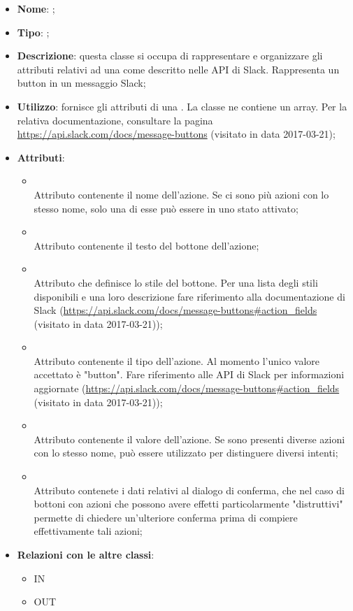\begin{itemize}
	\item \textbf{Nome}: ;
	\item \textbf{Tipo}: ;
	\item \textbf{Descrizione}: questa classe si occupa di rappresentare e organizzare gli attributi relativi ad una  come descritto nelle API di Slack. Rappresenta un button in un messaggio Slack;
	\item \textbf{Utilizzo}: fornisce gli attributi di una . La classe  ne contiene un array.
Per la relativa documentazione, consultare la pagina \url{https://api.slack.com/docs/message-buttons}  (visitato in data 2017-03-21);
	\item \textbf{Attributi}:
	\begin{itemize}
		\item[]  \\
		Attributo contenente il nome dell'azione. Se ci sono più azioni con lo stesso nome, solo una di esse può essere in uno stato attivato;
		\item[]  \\
		Attributo contenente il testo del bottone dell'azione;
		\item[]  \\
		Attributo che definisce lo stile del bottone. Per una lista degli stili disponibili e una loro descrizione fare riferimento alla documentazione di Slack (\url{https://api.slack.com/docs/message-buttons#action_fields} (visitato in data 2017-03-21));
		\item[]  \\
		Attributo contenente il tipo dell'azione. Al momento l'unico valore accettato è "button". Fare riferimento alle API di   Slack per informazioni aggiornate (\url{https://api.slack.com/docs/message-buttons#action_fields} (visitato in data 2017-03-21));
		\item[]  \\
		Attributo contenente il valore dell'azione. Se sono presenti diverse azioni con lo stesso nome, può essere utilizzato per distinguere diversi intenti;
		\item[]  \\
		Attributo contenete i dati relativi al dialogo di conferma, che nel caso di bottoni con azioni che possono avere effetti particolarmente "distruttivi" permette di chiedere un'ulteriore conferma prima di compiere effettivamente tali azioni;
	\end{itemize}
	\item \textbf{Relazioni con le altre classi}:
	\begin{itemize}
		\item IN \hyperlink{Attachment_label}{}
		\item OUT \hyperlink{ConfirmationFields_label}{}
	\end{itemize}
\end{itemize}
\FloatBarrier

